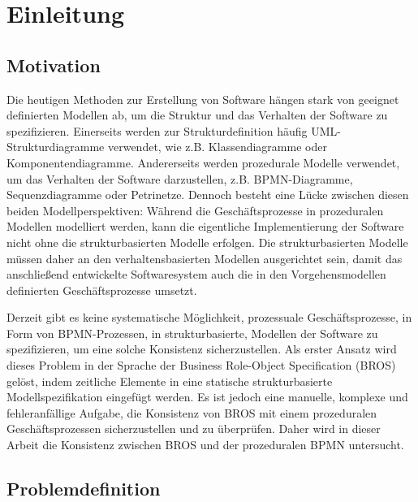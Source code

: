 \chapter{Einleitung}
\label{chap:introduction}

\section{Motivation}

Die heutigen Methoden zur Erstellung von Software hängen stark von geeignet definierten Modellen ab, um die Struktur und das Verhalten der Software zu spezifizieren.
Einerseits werden zur Strukturdefinition häufig UML-Strukturdiagramme verwendet, wie z.B. Klassendiagramme oder Komponentendiagramme.
Andererseits werden prozedurale Modelle verwendet, um das Verhalten der Software darzustellen, z.B. BPMN-Diagramme, Sequenzdiagramme oder Petrinetze.
Dennoch besteht eine Lücke zwischen diesen beiden Modellperspektiven: Während die Geschäftsprozesse in prozeduralen Modellen modelliert werden, kann die eigentliche Implementierung der Software nicht ohne die strukturbasierten Modelle erfolgen.
Die strukturbasierten Modelle müssen daher an den verhaltensbasierten Modellen ausgerichtet sein, damit das anschließend entwickelte Softwaresystem auch die in den Vorgehensmodellen definierten Geschäftsprozesse umsetzt.

Derzeit gibt es keine systematische Möglichkeit, prozessuale Geschäftsprozesse, in Form von BPMN-Prozessen, in strukturbasierte, Modellen der Software zu spezifizieren, um eine solche Konsistenz sicherzustellen.
Als erster Ansatz wird dieses Problem in der Sprache der Business Role-Object Specification (BROS) gelöst, indem zeitliche Elemente in eine statische strukturbasierte Modellspezifikation eingefügt werden.
Es ist jedoch eine manuelle, komplexe und fehleranfällige Aufgabe, die Konsistenz von BROS mit einem prozeduralen Geschäftsprozessen sicherzustellen und zu überprüfen.
Daher wird in dieser Arbeit die Konsistenz zwischen BROS und der prozeduralen BPMN untersucht.

\section{Problemdefinition}

